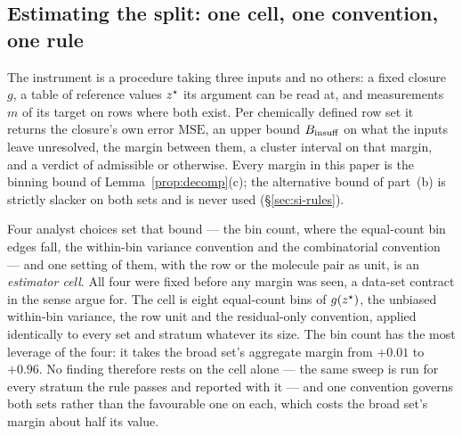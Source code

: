 \subsection{Estimating the split: one cell, one convention, one rule}
\label{sec:estimator}
The instrument is a procedure taking three inputs and no others: a fixed closure $g$, a table of
reference values $z^\star$ its argument can be read at, and measurements $m$ of its target on rows
where both exist. Per chemically defined row set it returns the closure's own error $\mathrm{MSE}$,
an upper bound $B_{\mathrm{insuff}}$ on what the inputs leave unresolved, the margin between them, a cluster
interval on that margin, and a verdict of admissible or otherwise. Every margin in this paper is
the binning bound of Lemma~\ref{prop:decomp}(c); the alternative bound of part~(b) is strictly
slacker on both sets and is never used (\S\ref{sec:si-rules}).

Four analyst choices set that bound --- the bin count, where the equal-count bin edges fall, the
within-bin variance convention and the combinatorial convention --- and one setting of them, with
the row or the molecule pair as unit, is an \emph{estimator cell}. All four were fixed before any
margin was seen, a data-set contract in the sense \citet{nael2026dataset} argue for. The cell is
eight equal-count bins of $g(z^\star)$, the unbiased within-bin variance, the row unit and the
residual-only convention, applied identically to every set and stratum whatever its size. The bin
count has the most leverage of the four: it takes the broad set's aggregate margin from $+0.01$ to
$+0.96$. No finding therefore rests on the cell alone --- the same sweep is run for every stratum
the rule passes and reported with it --- and one convention governs both sets rather than the
favourable one on each, which costs the broad set's margin about half its value.

